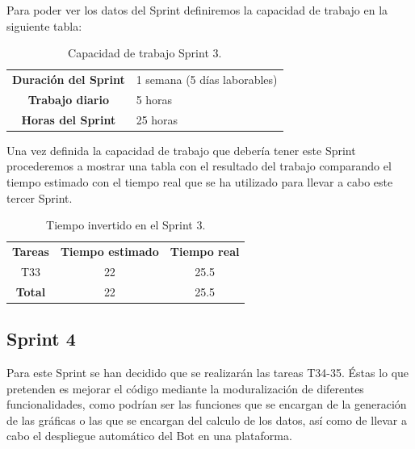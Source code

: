 Para poder ver los datos del Sprint definiremos la capacidad de trabajo en la siguiente tabla:

\begin{table}[H]
	\begin{center}
		\begin{tabular}{| c | p{9cm} |}
			\hline
			
			\textbf{Duración del Sprint} & 1 semana (5 días laborables) \\
			\textbf{Trabajo diario} & 5 horas \\
			\textbf{Horas del Sprint} & 25 horas \\ \hline
		\end{tabular}
		\caption{Capacidad de trabajo Sprint 3.}

	\end{center}
\end{table}

Una vez definida la capacidad de trabajo que debería tener este Sprint procederemos a mostrar una tabla con el resultado del trabajo comparando el tiempo estimado con el tiempo real que se ha utilizado para llevar a cabo este tercer Sprint.

\begin{table}[H]
	\begin{center}
		\begin{tabular}{| c | c | c |}
			\hline
			
			\textbf{Tareas} & \textbf{Tiempo estimado} & \textbf{Tiempo real} \\
			T33 & 22 & 25.5 \\
			\textbf{Total} & 22 & 25.5 \\ \hline
		\end{tabular}
		\caption{Tiempo invertido en el Sprint 3.}
	\end{center}
\end{table}

\subsection{Sprint 4}

Para este Sprint se han decidido que se realizarán las tareas T34-35. Éstas lo que pretenden es mejorar el código mediante la moduralización de diferentes funcionalidades, como podrían ser las funciones que se encargan de la generación de las gráficas o las que se encargan del calculo de los datos, así como de llevar a cabo el despliegue automático del Bot en una plataforma.

